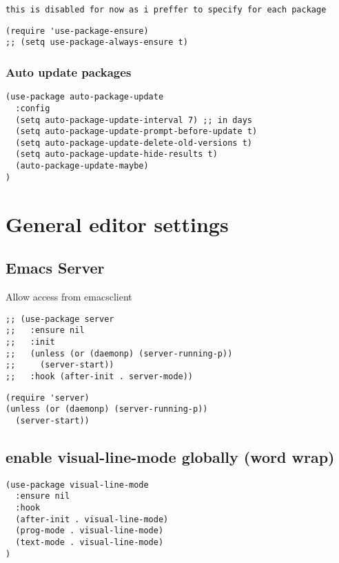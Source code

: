 \documentclass[11pt]{article}
\begin{document}
\begin{verbatim}
this is disabled for now as i preffer to specify for each package
\end{verbatim}

\begin{verbatim}
(require 'use-package-ensure)
;; (setq use-package-always-ensure t)
\end{verbatim}

\subsubsection*{Auto update packages}
\label{sec:orgdb00c6d}
\begin{verbatim}
(use-package auto-package-update
  :config
  (setq auto-package-update-interval 7) ;; in days
  (setq auto-package-update-prompt-before-update t)
  (setq auto-package-update-delete-old-versions t)
  (setq auto-package-update-hide-results t)
  (auto-package-update-maybe)
)
\end{verbatim}


\section*{General editor settings}
\label{sec:org0de5f67}

\subsection*{Emacs Server}
\label{sec:org7679eeb}
Allow access from emacsclient
\begin{verbatim}
;; (use-package server
;;   :ensure nil
;;   :init
;;   (unless (or (daemonp) (server-running-p))
;;     (server-start))
;;   :hook (after-init . server-mode))
\end{verbatim}

\begin{verbatim}
(require 'server)
(unless (or (daemonp) (server-running-p))
  (server-start))
\end{verbatim}

\subsection*{enable visual-line-mode globally (word wrap)}
\label{sec:org3542815}
\begin{verbatim}
(use-package visual-line-mode
  :ensure nil
  :hook
  (after-init . visual-line-mode)
  (prog-mode . visual-line-mode)
  (text-mode . visual-line-mode)
)
\end{verbatim}
\end{document}
